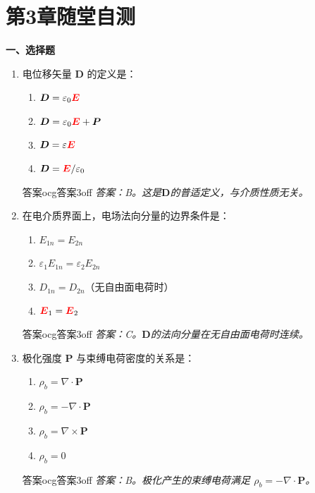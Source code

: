\documentclass[11pt,a4paper,openany,oneside]{book}
\newcommand{\vecE}{\textcolor{red}{\vect{E}}}
\newcommand{\eps}{\varepsilon}
\newcommand{\vect}[1]{\bm{#1}}
\newcommand{\curl}{\nabla\times}
\newcommand{\divg}{\nabla\cdot}
\begin{document}
\section*{第3章随堂自测}

\begin{miniquiz}
\textbf{一、选择题}
\begin{enumerate}[label=\arabic*.]
\item 电位移矢量 $\vect{D}$ 的定义是：
  \begin{enumerate}[label=(\Alph*),nosep]
  \item $\vect{D} = \eps_0\vecE$
  \item $\vect{D} = \eps_0\vecE + \vect{P}$
  \item $\vect{D} = \eps\vecE$
  \item $\vect{D} = \vecE/\eps_0$
  \end{enumerate}
\begin{ocg}{答案}{ocg答案3}{off}
  \textit{答案：B。这是$\vect{D}$的普适定义，与介质性质无关。}
\end{ocg}

\item 在电介质界面上，电场法向分量的边界条件是：
  \begin{enumerate}[label=(\Alph*),nosep]
  \item $E_{1n} = E_{2n}$
  \item $\eps_1 E_{1n} = \eps_2 E_{2n}$
  \item $D_{1n} = D_{2n}$（无自由面电荷时）
  \item $\vecE_1 = \vecE_2$
  \end{enumerate}
\begin{ocg}{答案}{ocg答案3}{off}
  \textit{答案：C。$\vect{D}$的法向分量在无自由面电荷时连续。}
\end{ocg}

\item 极化强度 $\vect{P}$ 与束缚电荷密度的关系是：
  \begin{enumerate}[label=(\Alph*),nosep]
  \item $\rho_b = \divg\vect{P}$
  \item $\rho_b = -\divg\vect{P}$
  \item $\rho_b = \curl\vect{P}$
  \item $\rho_b = 0$
  \end{enumerate}
\begin{ocg}{答案}{ocg答案3}{off}
  \textit{答案：B。极化产生的束缚电荷满足 $\rho_b = -\divg\vect{P}$。}
\end{ocg}
\end{enumerate}


\end{miniquiz}
\end{document}

